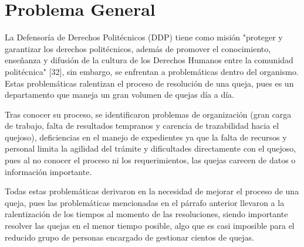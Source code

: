 \section{Problema General}
La Defensoría de Derechos Politécnicos (DDP) tiene como misión "proteger y garantizar los derechos politécnicos, además de promover el conocimiento, enseñanza y difusión de la cultura de los Derechos Humanos entre la comunidad politécnica" [32], sin embargo, se enfrentan a problemáticas dentro del organismo. Estas problemáticas ralentizan el proceso de resolución de una queja, pues es un departamento que maneja un gran volumen de quejas día a día.

Tras conocer su proceso, se identificaron problemas de organización (gran carga de trabajo, falta de resultados tempranos y carencia de trazabilidad hacia el quejoso), deficiencias en el manejo de expedientes ya que la falta de recursos y personal limita la agilidad del trámite y dificultades directamente con el quejoso, pues al no conocer el proceso ni los requerimientos, las quejas carecen de datos o información importante.

Todas estas problemáticas derivaron en la necesidad de mejorar el proceso de una queja, pues las problemáticas mencionadas en el párrafo anterior llevaron a la ralentización de los tiempos al momento de las resoluciones, siendo importante resolver las quejas en el menor tiempo posible, algo que es casi imposible para el reducido grupo de personas encargado de gestionar cientos de quejas.